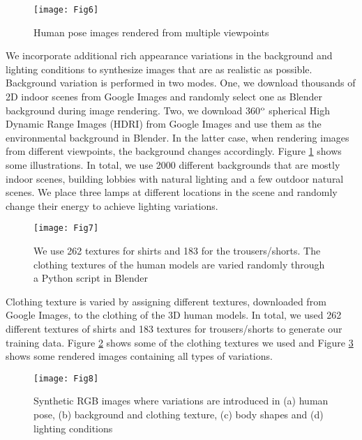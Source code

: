 \documentclass[twocolumn]{svjour3}          \smartqed  \usepackage{graphicx}
\begin{document}
\begin{figure}[t]
\centering
\texttt{[image: Fig6]}
\caption{Human pose images rendered from multiple viewpoints}
\label{fig:view_variance}
\vspace{-1mm}
\end{figure}

\vspace{2mm}
 We incorporate additional rich appearance variations in the background and lighting conditions to synthesize images that are as realistic as possible. Background variation is performed in two modes. One, we download thousands of 2D indoor scenes from Google Images and randomly select one as Blender background during image rendering. Two,  we download 360$^{\rm o}$ spherical High Dynamic Range Images (HDRI) from Google Images and use them as the environmental background in Blender. In the latter case, when rendering images from different viewpoints, the background changes accordingly. Figure \ref{fig:view_variance} shows some illustrations. In total, we use 2000 different backgrounds that are mostly indoor scenes, building lobbies with natural lighting and a few outdoor natural scenes. We place three lamps at different locations in the scene and randomly change their energy to achieve lighting variations.

\begin{figure}[t]
\centering
\texttt{[image: Fig7]}
\caption{We use 262 textures for shirts and 183 for the trousers/shorts. The clothing textures of the human models are varied randomly through a Python script in Blender}
\label{fig:clothing}
\end{figure}

\vspace{2mm}
 Clothing texture is varied by assigning different textures, downloaded from Google Images, to the clothing of the 3D human models. In total, we used 262 different textures of shirts and 183 textures for trousers/shorts to generate our training data. Figure \ref{fig:clothing} shows some of the clothing textures we used and Figure \ref{fig:all_variances} shows some rendered images containing all types of variations.

\begin{figure}[t]
\centering
\texttt{[image: Fig8]}
\caption{Synthetic RGB images where variations are introduced in (a) human pose, (b) background and clothing texture, (c) body shapes and (d) lighting conditions}
\label{fig:all_variances}
\end{figure}
\end{document}
